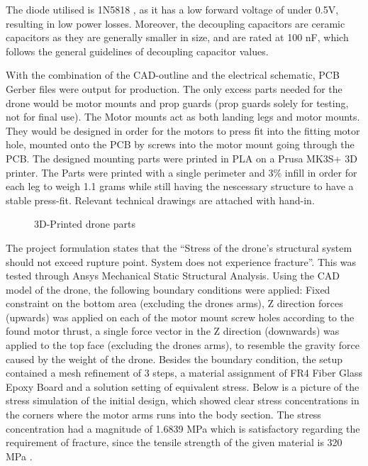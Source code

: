 The diode utilised is 1N5818 \cite{1N5818}, as it has a low 
forward voltage of under 0.5V, resulting in low 
power losses. Moreover, the decoupling capacitors
are ceramic capacitors as they are generally smaller
in size, and are rated at 100 nF, which follows 
the general guidelines of decoupling capacitor values.
\cite{DecouplingCap}

With the combination of the CAD-outline and the electrical schematic, PCB Gerber files were output for production. The only excess parts needed for the drone would be motor mounts and prop guards (prop guards solely for testing, not for final use). The Motor mounts act as both landing legs and motor mounts. They would be designed in order for the motors to press fit into the fitting motor hole, mounted onto the PCB by screws into the motor mount going through the PCB. The designed mounting parts were printed in PLA on a Prusa MK3S+ 3D printer. The Parts were printed with a single perimeter and 3\% infill in order for each leg to weigh 1.1 grams while still having the nescessary structure to have a stable press-fit. Relevant technical drawings are attached with hand-in. 

\begin{figure}[H]%
    \centering
    \qquad
    \qquad
    \caption{3D-Printed drone parts}%
    \label{fig:example}%
\end{figure}

The project formulation states that the “Stress of the drone’s structural system should not exceed rupture point. System does not experience fracture”. This was tested through Ansys Mechanical Static Structural Analysis. Using the CAD model of the drone, the following boundary conditions were applied: Fixed constraint on the bottom area (excluding the drones arms), Z direction forces (upwards) was applied on each of the motor mount screw holes according to the found motor thrust, a single force vector in the Z direction (downwards) was applied to the top face (excluding the drones arms), to resemble the gravity force caused by the weight of the drone. Besides the boundary condition, the setup contained a mesh refinement of 3 steps, a material assignment of FR4 Fiber Glass Epoxy Board and a solution setting of equivalent stress. Below is a picture of the stress simulation of the initial design, which showed clear stress concentrations in the corners where the motor arms runs into the body section. The stress concentration had a magnitude of 1.6839 MPa which is satisfactory regarding the requirement of fracture, since the tensile strength of the given material is 320 MPa \cite{FR4}. 

